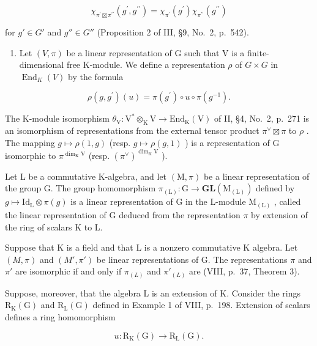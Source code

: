 \[
\chi_ {\pi^ {\prime} \boxtimes \pi^ {\prime \prime}} (g ^ {\prime}, g ^ {\prime \prime}) = \chi_ {\pi^ {\prime}} (g ^ {\prime}) \chi_ {\pi^ {\prime \prime}} (g ^ {\prime \prime})
\]

for \(g' \in G'\) and \(g'' \in G''\) (Proposition 2 of III, §9, No.~2, p.~542).

\begin{enumerate}
\def\labelenumi{\arabic{enumi})}
\setcounter{enumi}{5}
\tightlist
\item
  Let \((V,\pi)\) be a linear representation of G such that V is a finite-dimensional free K-module. We define a representation \(\rho\) of \(G\times G\) in \(\operatorname{End}_{K}(V)\) by the formula
\end{enumerate}

\[
\rho (g, g ^ {\prime}) (u) = \pi (g ^ {\prime}) \circ u \circ \pi (g ^ {- 1}).
\]

The K-module isomorphism \(\theta_{\mathrm{V}}: \mathrm{V}^{*} \otimes_{\mathrm{K}} \mathrm{V} \to \mathrm{End}_{\mathrm{K}}(\mathrm{V})\) of II, §4, No.~2, p.~271 is an isomorphism of representations from the external tensor product \(\pi^{\vee} \boxtimes \pi\) to \(\rho\) . The mapping \(g \mapsto \rho(1, g)\) (resp. \(g \mapsto \rho(g, 1)\) ) is a representation of G isomorphic to \(\pi^{\dim_{\mathrm{K}} \mathrm{V}}\) (resp. \((\pi^{\vee})^{\dim_{\mathrm{K}} \mathrm{V}}\) ).

Let L be a commutative K-algebra, and let \((\mathrm{M},\pi)\) be a linear representation of the group G. The group homomorphism \(\pi_{(\mathrm{L})}:\mathrm{G}\to\mathbf{GL}(\mathrm{M}_{(\mathrm{L})})\) defined by \(g\mapsto\mathrm{Id}_{\mathrm{L}}\otimes\pi(g)\) is a linear representation of G in the L-module \(\mathrm{M}_{(\mathrm{L})}\) , called the linear representation of G deduced from the representation \(\pi\) by extension of the ring of scalars K to L.

Suppose that K is a field and that L is a nonzero commutative K algebra. Let \((M,\pi)\) and \((M',\pi')\) be linear representations of G. The representations \(\pi\) and \(\pi'\) are isomorphic if and only if \(\pi_{(L)}\) and \(\pi'_{(L)}\) are (VIII, p.~37, Theorem 3).

Suppose, moreover, that the algebra L is an extension of K. Consider the rings \(\mathrm{R}_{\mathrm{K}}(\mathrm{G})\) and \(\mathrm{R}_{\mathrm{L}}(\mathrm{G})\) defined in Example 1 of VIII, p.~198. Extension of scalars defines a ring homomorphism

\[
u: \mathrm{R} _ {\mathrm{K}} (\mathrm{G}) \longrightarrow \mathrm{R} _ {\mathrm{L}} (\mathrm{G}).
\]

